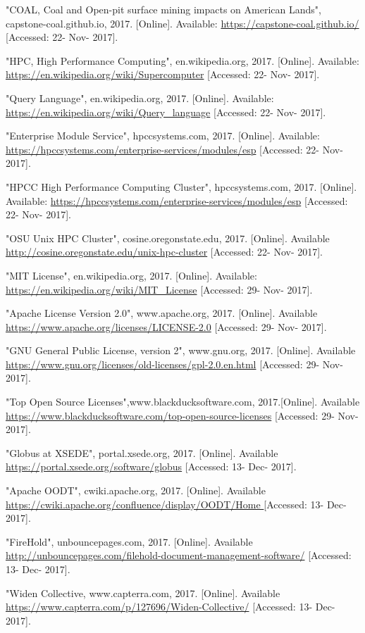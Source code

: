 \documentclass[10pt,draftclsnofoot,onecolumn,journal,compsoc]{IEEEtran}
\begin{document}
\begin{thebibliography}{9}
 "COAL, Coal and Open-pit surface mining impacts on American Lands", capstone-coal.github.io, 2017. [Online]. Available: \url{https://capstone-coal.github.io/} [Accessed: 22- Nov- 2017].

 "HPC, High Performance Computing", en.wikipedia.org, 2017. [Online]. Available: \url{https://en.wikipedia.org/wiki/Supercomputer} [Accessed: 22- Nov- 2017].

 "Query Language", en.wikipedia.org, 2017. [Online]. Available: \url{https://en.wikipedia.org/wiki/Query_language} [Accessed: 22- Nov- 2017].

 "Enterprise Module Service", hpccsystems.com, 2017. [Online]. Available: \url{https://hpccsystems.com/enterprise-services/modules/esp} [Accessed: 22- Nov- 2017].

 "HPCC High Performance Computing Cluster", hpccsystems.com, 2017. [Online]. Available: \url{https://hpccsystems.com/enterprise-services/modules/esp} [Accessed: 22- Nov- 2017].

 "OSU Unix HPC Cluster", cosine.oregonstate.edu, 2017. [Online]. Available \url{http://cosine.oregonstate.edu/unix-hpc-cluster} [Accessed: 22- Nov- 2017].

 "MIT License", en.wikipedia.org, 2017. [Online]. Available: \url{https://en.wikipedia.org/wiki/MIT_License} [Accessed: 29- Nov- 2017].

 "Apache License Version 2.0", www.apache.org, 2017. [Online]. Available \url{https://www.apache.org/licenses/LICENSE-2.0} [Accessed: 29- Nov- 2017].

 "GNU General Public License, version 2", www.gnu.org, 2017. [Online]. Available \url{https://www.gnu.org/licenses/old-licenses/gpl-2.0.en.html} [Accessed: 29- Nov- 2017].

 "Top Open Source Licenses",www.blackducksoftware.com, 2017.[Online]. Available \url{https://www.blackducksoftware.com/top-open-source-licenses} [Accessed: 29- Nov- 2017].

 "Globus at XSEDE", portal.xsede.org, 2017. [Online]. Available \url{https://portal.xsede.org/software/globus} [Accessed: 13- Dec- 2017].

 "Apache OODT", cwiki.apache.org, 2017. [Online]. Available \url{https://cwiki.apache.org/confluence/display/OODT/Home } [Accessed: 13- Dec- 2017].

 "FireHold", unbouncepages.com, 2017. [Online]. Available \url{http://unbouncepages.com/filehold-document-management-software/} [Accessed: 13- Dec- 2017].

 "Widen Collective, www.capterra.com, 2017. [Online]. Available \url{https://www.capterra.com/p/127696/Widen-Collective/} [Accessed: 13- Dec- 2017].
\end{thebibliography}
\end{document}
